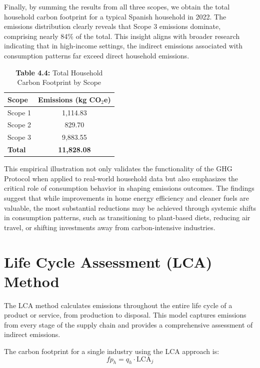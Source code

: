 \documentclass[12pt,a4paper]{article}%
\begin{document}
Finally, by summing the results from all three scopes, we obtain the total household carbon footprint for a typical Spanish household in 2022. The emissions distribution clearly reveals that Scope 3 emissions dominate, comprising nearly 84\% of the total. This insight aligns with broader research indicating that in high-income settings, the indirect emissions associated with consumption patterns far exceed direct household emissions.


\begin{table}[h]
\centering
\caption*{\textbf{Table 4.4:} Total Household Carbon Footprint by Scope}\label{tab:total_emissions}
\begin{tabular}{lc}
\toprule
\textbf{Scope} & \textbf{Emissions (kg CO$_2$e)} \\
\midrule
Scope 1 & 1,114.83 \\
Scope 2 &   829.70 \\
Scope 3 & 9,883.55 \\
\midrule
\textbf{Total} & \textbf{11,828.08} \\
\bottomrule
\end{tabular}
\end{table}


This empirical illustration not only validates the functionality of the GHG Protocol when applied to real-world household data but also emphasizes the critical role of consumption behavior in shaping emissions outcomes. The findings suggest that while improvements in home energy efficiency and cleaner fuels are valuable, the most substantial reductions may be achieved through systemic shifts in consumption patterns, such as transitioning to plant-based diets, reducing air travel, or shifting investments away from carbon-intensive industries.
\section{Life Cycle Assessment (LCA) Method}
The LCA method calculates emissions throughout the entire life cycle of a product or service, from production to disposal. This model captures emissions from every stage of the supply chain and provides a comprehensive assessment of indirect emissions.

The carbon footprint for a single industry using the LCA approach is:
\begin{equation}
   fp_h = q_h \cdot \text{LCA}_j 
\end{equation}
\end{document}
